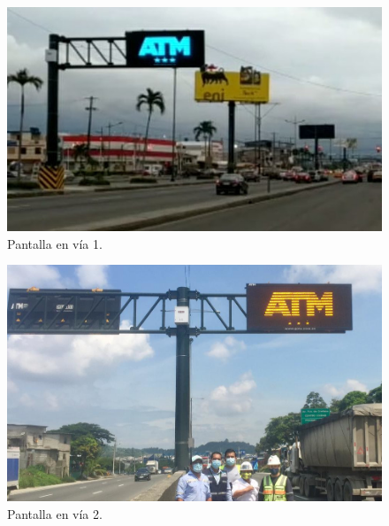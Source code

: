 \begin{figure}[htpb]
	\centering
	\includegraphics[scale=3]{Figures/calle1.jpg} 
	\caption{Pantalla en vía 1.}
	\label{fig: calle1}
\end{figure}

\begin{figure}[htpb]
	\centering
	\includegraphics[scale=1.5]{Figures/calle2.jpg} 
	\caption{Pantalla en vía 2.}
	\label{fig: calle2}
\end{figure}

